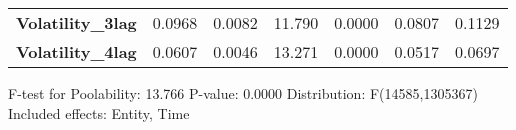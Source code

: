 \begin{center}
\begin{tabular}{lcccccc}
\textbf{Volatility\_3lag}               &       0.0968       &       0.0082       &      11.790     &      0.0000      &       0.0807      &       0.1129       \\
\textbf{Volatility\_4lag}               &       0.0607       &       0.0046       &      13.271     &      0.0000      &       0.0517      &       0.0697       \\
\bottomrule
\end{tabular}
\end{center}

F-test for Poolability: 13.766 \newline
 P-value: 0.0000 \newline
 Distribution: F(14585,1305367) \newline
  \newline
 Included effects: Entity, Time